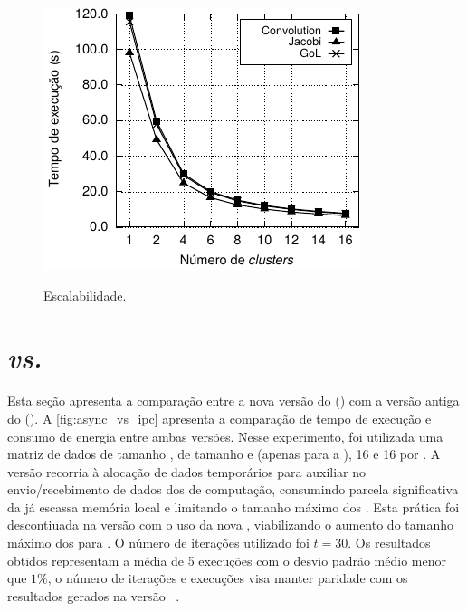 \begin{figure}
	\centering
	\caption{Escalabilidade.}
	\includegraphics[width=.7\textwidth]{figs/MPPAPlotScalabilityAPI.pdf}
	\label{fig:escalabilidade}
\end{figure}

\section{\mppa \async \textit{vs.} \mppa \ipc}
\label{sec:async_vs_ipc}

Esta seção apresenta a comparação entre a nova versão do \pskelmppa (\async) com a versão antiga do \pskelmppa (\ipc). 
A \autoref{fig:async_vs_ipc} apresenta a comparação de tempo de execução e consumo de energia entre ambas versões.
Nesse experimento, foi utilizada uma matriz de dados de tamanho \ind, \tiles de tamanho \tilec e \tiled (apenas para a \async), 16 \clusters e 16 \pes por \cluster.
A versão \ipc recorria à alocação de dados temporários para auxiliar no envio/recebimento de dados dos \clusters de computação, consumindo parcela significativa da já escassa memória local e limitando o tamanho máximo dos \tiles.
Esta prática foi descontiuada na versão \async com o uso da nova \api, viabilizando o aumento do tamanho máximo dos \tiles para \tiled.
O número de iterações utilizado foi $t = 30$. Os resultados obtidos representam a média de 5 execuções com o desvio padrão médio menor que $1\%$, o número de iterações e execuções visa manter paridade com os resultados gerados na versão \ipc~\cite{Podesta:TCC}. 

